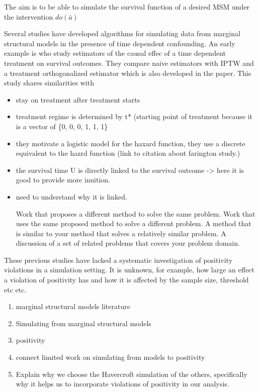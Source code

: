\documentclass[11pt]{article}
\begin{document}
    The aim is to be able to simulate the survival function of a desired MSM
under the intervention \(do(\bar a)\)

Several studies have developed algorithms for simulating data from
marginal structural models in the presence of time dependent
confounding. An early example is \citet{bryan2004} who study estimators
of the causal effec of a time dependent treatment on survival outcomes.
They compare naive estimators with IPTW and a treatment orthogonalized
estimator which is also developed in the paper. This study shares
similarities with \citet{Havercroft2012}

\begin{itemize}
\item
  stay on treatment after treatment starts
\item
  treatment regime is determined by t* (starting point of treatment
  because it is a vector of \{0, 0, 0, 1, 1, 1\}
\item
  they motivate a logistic model for the haxard function, they use a
  discrete equivalent to the hazrd function (link to citation about
  farington study.)
\item
  the survival time U is directly linked to the survival outcome
  -\textgreater{} here it is good to provide more inuition.
\item
  need to understand why it is linked.

  Work that proposes a different method to solve the same problem. Work
  that uses the same proposed method to solve a different problem. A
  method that is similar to your method that solves a relatively similar
  problem. A discussion of a set of related problems that covers your
  problem domain.
\end{itemize}

These previous studies have lacked a systematic investigation of
positivity violations in a simulation setting. It is unknown, for
example, how large an effect a violation of positivity has and how it is
affected by the sample size, threshold etc etc.

\begin{enumerate}
\def\labelenumi{\arabic{enumi}.}
\item
  marginal structural models literature
\item
  Simulating from marginal structural models
\item
  positivity
\item
  connect limited work on simulating from models to positivity
\item
  Explain why we choose the Havercroft simulation of the others,
  specifically why it helps us to incorporate violations of positivity
  in our analysis.
\end{enumerate}
\end{document}
